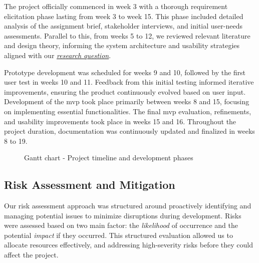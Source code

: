 The project officially commenced in week 3 with a thorough requirement elicitation phase lasting from week 3 to week 15. This phase included detailed analysis of the assignment brief, stakeholder interviews, and initial user-needs assessments. Parallel to this, from weeks 5 to 12, we reviewed relevant literature and design theory, informing the system architecture and usability strategies aligned with our \hyperref[subsec:rq1]{\textit{research question}}.

Prototype development was scheduled for weeks 9 and 10, followed by the first user test in weeks 10 and 11. Feedback from this initial testing informed iterative improvements, ensuring the product continuously evolved based on user input. Development of the \acrshort{mvp} took place primarily between weeks 8 and 15, focusing on implementing essential functionalities. The final \acrshort{mvp} evaluation, refinements, and usability improvements took place in weeks 15 and 16. Throughout the project duration, documentation was continuously updated and finalized in weeks 8 to 19.

\begin{figure}[H]
    \centering
    \caption{Gantt chart - Project timeline and development phases}
    \label{fig:gantt_dev}
\end{figure}

\subsection{Risk Assessment and Mitigation}
\label{subsec:risk_analysis}
Our risk assessment approach was structured around proactively identifying and managing potential issues to minimize disruptions during development. Risks were assessed based on two main factor: the \textit{likelihood} of occurrence and the potential \textit{impact} if they occurred. This structured evaluation allowed us to allocate resources effectively, and addressing high-severity risks before they could affect the project.

